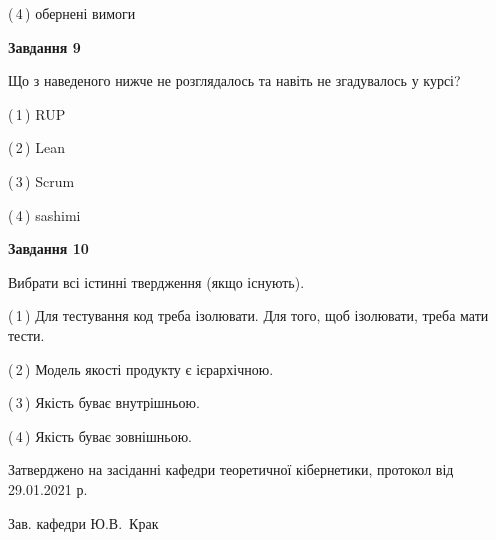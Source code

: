 \documentclass[10pt, ukrainian]{article}
\begin{document}
{\begin {large}
(\,4\,) обернені вимоги%


{\begin {center}\textbf{Завдання 9}\end {center}}\par
Що з наведеного нижче не розглядалось та навіть не згадувалось у курсі?\par
\vspace{2mm}



(\,1\,) RUP%



(\,2\,) Lean%



(\,3\,) Scrum%



(\,4\,) sashimi%


{\begin {center}\textbf{Завдання 10}\end {center}}\par
Вибрати всі істинні твердження (якщо існують).\par
\vspace{2mm}



(\,1\,) Для тестування код треба ізолювати. Для того, щоб ізолювати, треба мати тести.%



(\,2\,) Модель якості продукту є ієрархічною.%



(\,3\,) Якість буває внутрішньою.%



(\,4\,) Якість буває зовнішньою.%



\end {large}}
{\vspace{5mm}\smallskip \begin {small} Затверджено на засіданні кафедри теоретичної кібернетики, протокол  від   29.01.2021 р.\par\smallskip\smallskip
{\parbox {6.5 cm}{Зав. кафедри \dotfill Ю.В.~Крак}} \end{small}}
\newpage
\end{document}
